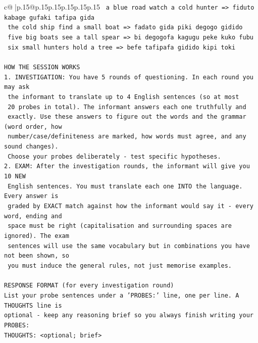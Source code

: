 \documentclass{article}
\begin{document}
{\begin{supertabular}{c@{$\;$}|p{.15\linewidth}@{}p{.15\linewidth}p{.15\linewidth}p{.15\linewidth}p{.15\linewidth}p{.15\linewidth}}
{{{\texttt{    a blue road watch a cold hunter  =>  fiduto kabage gufaki tafipa gida} \\
\texttt{    the cold ship find a small boat  =>  fadato gida piki degogo gidido} \\
\texttt{    five big boats see a tall spear  =>  bi degogofa kagugu peke kuko fubu} \\
\texttt{    six small hunters hold a tree  =>  befe tafipafa gidido kipi toki} \\
\\ 
\texttt{HOW THE SESSION WORKS} \\
\texttt{1. INVESTIGATION: You have 5 rounds of questioning. In each round you may ask} \\
\texttt{   the informant to translate up to 4 English sentences (so at most} \\
\texttt{   20 probes in total). The informant answers each one truthfully and} \\
\texttt{   exactly. Use these answers to figure out the words and the grammar (word order, how} \\
\texttt{   number/case/definiteness are marked, how words must agree, and any sound changes).} \\
\texttt{   Choose your probes deliberately {-} test specific hypotheses.} \\
\texttt{2. EXAM: After the investigation rounds, the informant will give you 10 NEW} \\
\texttt{   English sentences. You must translate each one INTO the language. Every answer is} \\
\texttt{   graded by EXACT match against how the informant would say it {-} every word, ending and} \\
\texttt{   space must be right (capitalisation and surrounding spaces are ignored). The exam} \\
\texttt{   sentences will use the same vocabulary but in combinations you have not been shown, so} \\
\texttt{   you must induce the general rules, not just memorise examples.} \\
\\ 
\texttt{RESPONSE FORMAT (for every investigation round)} \\
\texttt{List your probe sentences under a 'PROBES:' line, one per line. A THOUGHTS line is} \\
\texttt{optional {-} keep any reasoning brief so you always finish writing your PROBES:} \\
\texttt{THOUGHTS: <optional; brief>} \\
}}}
\end{supertabular}}
\end{document}
